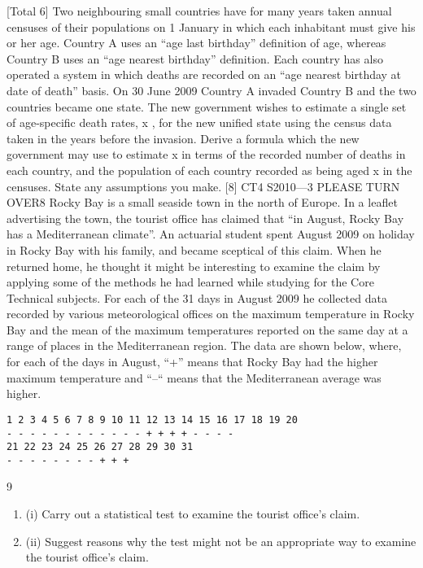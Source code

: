 \documentclass[a4paper,12pt]{article}
\begin{document}
\begin{enumerate}

[Total 6]
Two neighbouring small countries have for many years taken annual censuses of their
populations on 1 January in which each inhabitant must give his or her age. Country
A uses an “age last birthday” definition of age, whereas Country B uses an “age
nearest birthday” definition. Each country has also operated a system in which deaths
are recorded on an “age nearest birthday at date of death” basis.
On 30 June 2009 Country A invaded Country B and the two countries became one
state. The new government wishes to estimate a single set of age-specific death rates,
\mu x , for the new unified state using the census data taken in the years before the
invasion.
Derive a formula which the new government may use to estimate \mu x in terms of the
recorded number of deaths in each country, and the population of each country
recorded as being aged x in the censuses. State any assumptions you make.
[8]
CT4 S2010—3
PLEASE TURN OVER8
Rocky Bay is a small seaside town in the north of Europe. In a leaflet advertising the
town, the tourist office has claimed that “in August, Rocky Bay has a Mediterranean
climate”. An actuarial student spent August 2009 on holiday in Rocky Bay with his
family, and became sceptical of this claim. When he returned home, he thought it
might be interesting to examine the claim by applying some of the methods he had
learned while studying for the Core Technical subjects. For each of the 31 days in
August 2009 he collected data recorded by various meteorological offices on the
maximum temperature in Rocky Bay and the mean of the maximum temperatures
reported on the same day at a range of places in the Mediterranean region.
The data are shown below, where, for each of the days in August, “+” means that
Rocky Bay had the higher maximum temperature and “–“ means that the
Mediterranean average was higher.
\begin{verbatim}
1 2 3 4 5 6 7 8 9 10 11 12 13 14 15 16 17 18 19 20
- - - - - - - - - - - - + + + + - - - -
21 22 23 24 25 26 27 28 29 30 31
- - - - - - - - + + +
\end{verbatim}

9
\begin{enumerate}
\item (i) Carry out a statistical test to examine the tourist office’s claim.
\item 
(ii) Suggest reasons why the test might not be an appropriate way to examine the
tourist office’s claim.
\end{enumerate}


\end{enumerate}
\end{document}
